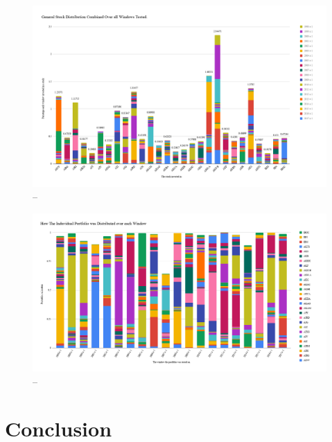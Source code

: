 \documentclass[11pt]{article}
\begin{document}
    \begin{figure}[H] %
        \includegraphics[width=\textwidth]{GeneralStockDistributionCombinedOverAllWindowsTested}
        \caption{--}
            \label{fig:GeneralStockDistributionCombinedOverAllWindowsTested}
    \end{figure}

    \begin{figure}[H] %
        \includegraphics[width=\textwidth]{HowTheInduvidualPortfolioWasDistributedOverEachWindow}
        \caption{--}
            \label{fig:HowTheInduvidualPortfolioWasDistributedOverEachWindow}
    \end{figure}
\section{Conclusion}

\pagebreak


\end{document}
